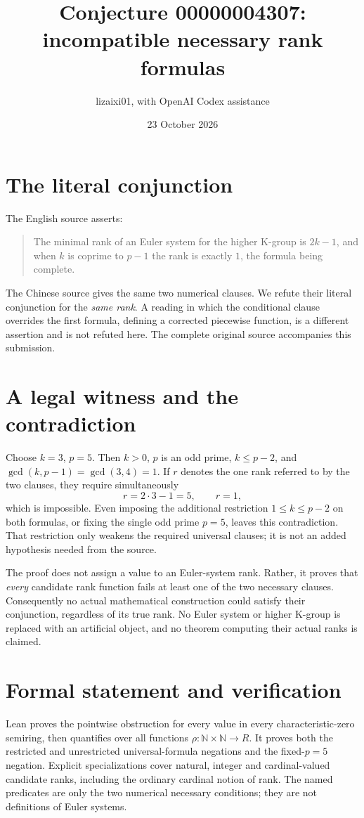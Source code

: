 \documentclass[11pt]{article}
\title{Conjecture 00000004307: incompatible necessary rank formulas}
\author{lizaixi01, with OpenAI Codex assistance}
\date{23 October 2026}
\begin{document}
\maketitle
\section{The literal conjunction}
The English source asserts:
\begin{quote}
The minimal rank of an Euler system for the higher K-group is
$2k-1$, and when $k$ is coprime to $p-1$ the rank is exactly $1$,
the formula being complete.
\end{quote}
The Chinese source gives the same two numerical clauses. We refute
their literal conjunction for the \emph{same rank}. A reading in
which the conditional clause overrides the first formula, defining
a corrected piecewise function, is a different assertion and is
not refuted here. The complete original source accompanies this
submission.

\section{A legal witness and the contradiction}
Choose $k=3$, $p=5$. Then $k>0$, $p$ is an odd prime,
$k\le p-2$, and $\gcd(k,p-1)=\gcd(3,4)=1$.
If $r$ denotes the one rank referred to by the two clauses, they
require simultaneously
\[
 r=2\cdot3-1=5,\qquad r=1,
\]
which is impossible. Even imposing the additional restriction
$1\le k\le p-2$ on both formulas, or fixing the single odd prime
$p=5$, leaves this contradiction. That restriction only weakens
the required universal clauses; it is not an added hypothesis
needed from the source.

The proof does not assign a value to an Euler-system rank.
Rather, it proves that \emph{every} candidate rank function fails
at least one of the two necessary clauses. Consequently no actual
mathematical construction could satisfy their conjunction,
regardless of its true rank. No Euler system or higher K-group is
replaced with an artificial object, and no theorem computing their
actual ranks is claimed.

\section{Formal statement and verification}
Lean proves the pointwise obstruction for every value in every
characteristic-zero semiring, then quantifies over all functions
$\rho:\mathbb N\times\mathbb N\to R$. It proves both the restricted
and unrestricted universal-formula negations and the fixed-$p=5$
negation. Explicit specializations cover natural, integer and
cardinal-valued candidate ranks, including the ordinary cardinal
notion of rank. The named predicates are only the two numerical
necessary conditions; they are not definitions of Euler systems.
\end{document}
